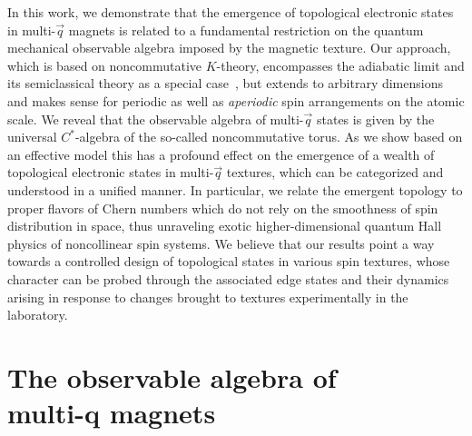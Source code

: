 \documentclass[
    10pt,
    aps,
    prb,
    twocolumn,
    floatfix,
    superscriptaddress,
]{revtex4-2}
\begin{document}
In this work, we demonstrate that the emergence of topological electronic states in multi-$\vec{q}$ magnets is related to a fundamental restriction on the quantum mechanical observable algebra imposed by the magnetic texture. 
Our approach, which is based on noncommutative $K$-theory, encompasses the adiabatic limit and its semiclassical theory as a special case~\cite{Su2020}, but extends 
to arbitrary dimensions and makes sense for periodic as well as {\it aperiodic} spin arrangements on the atomic scale.
We reveal that the observable algebra of multi-$\vec{q}$ states is given by the universal $C^\ast$-algebra of the so-called noncommutative torus. 
As we show based on an effective model this has a profound effect on the emergence of a wealth of topological electronic states in multi-$\vec{q}$ textures, which can be categorized and understood in a unified manner. 
In particular, we relate the emergent topology to proper flavors of Chern numbers which do not rely on the smoothness of spin distribution in space, thus unraveling exotic higher-dimensional quantum Hall physics of noncollinear spin systems.
We believe that our results point a way towards a controlled design of topological states in various spin textures, whose character can be probed through the associated edge states and their dynamics arising in response to changes brought to textures experimentally in the laboratory. 



\section{\texorpdfstring{The observable algebra of \\ multi-q magnets}{The observable algebra of multi-q magnets}}
\end{document}
